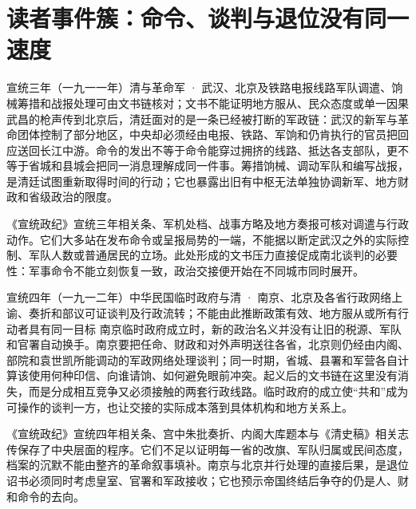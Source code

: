 \section{读者事件簇：命令、谈判与退位没有同一速度}

\begin{event}{}{宣统三年（一九一一年）}{清与革命军 · 武汉、北京及铁路电报线路}{军队调遣、饷械筹措和战报处理可由文书链核对；文书不能证明地方服从、民众态度或单一因果}
武昌的枪声传到北京后，清廷面对的是一条已经被打断的军政链：武汉的新军与革命团体控制了部分地区，中央却必须经由电报、铁路、军饷和仍肯执行的官员把回应送回长江中游。命令的发出不等于命令能穿过拥挤的线路、抵达各支部队，更不等于省城和县城会把同一消息理解成同一件事。筹措饷械、调动军队和编写战报，是清廷试图重新取得时间的行动；它也暴露出旧有中枢无法单独协调新军、地方财政和省级政治的限度。

《宣统政纪》宣统三年相关条、军机处档、战事方略及地方奏报可核对调遣与行政动作。它们大多站在发布命令或呈报局势的一端，不能据以断定武汉之外的实际控制、军队人数或普通居民的立场。此处形成的文书压力直接促成南北谈判的必要性：军事命令不能立刻恢复一致，政治交接便开始在不同城市同时展开。
\end{event}

\begin{event}{}{宣统四年（一九一二年）}{中华民国临时政府与清 · 南京、北京及各省行政网络}{上谕、奏折和部议可证谈判及行政流转；不能由此推断政策有效、地方服从或所有行动者具有同一目标}
南京临时政府成立时，新的政治名义并没有让旧的税源、军队和官署自动换手。南京要把任命、财政和对外声明送往各省，北京则仍经由内阁、部院和袁世凯所能调动的军政网络处理谈判；同一时期，省城、县署和军营各自计算该使用何种印信、向谁请饷、如何避免眼前冲突。起义后的文书链在这里没有消失，而是分成相互竞争又必须接触的两套行政线路。临时政府的成立使“共和”成为可操作的谈判一方，也让交接的实际成本落到具体机构和地方关系上。

《宣统政纪》宣统四年相关条、宫中朱批奏折、内阁大库题本与《清史稿》相关志传保存了中央层面的程序。它们不足以证明每一省的改旗、军队归属或民间态度，档案的沉默不能由整齐的革命叙事填补。南京与北京并行处理的直接后果，是退位诏书必须同时考虑皇室、官署和军政接收；它也预示帝国终结后争夺的仍是人、财和命令的去向。
\end{event}

